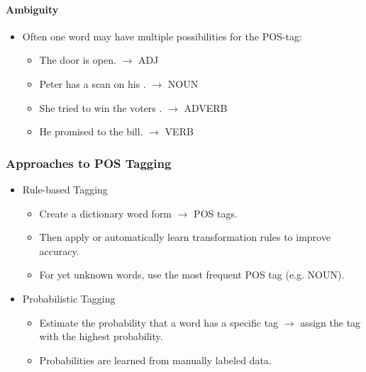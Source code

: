                 \paragraph{Ambiguity} %
                    \begin{itemize}
                    	\item Often one word may have multiple possibilities for the POS-tag:
                    		\begin{itemize}
                    			\item The  door is open. \( \rightarrow \) ADJ
                    			\item Peter has a scan on his . \( \rightarrow \) NOUN
                    			\item She tried to win the voters . \( \rightarrow \) ADVERB
                    			\item He promised to  the bill. \( \rightarrow \) VERB
                    		\end{itemize}
                    \end{itemize}

            \subsubsection{Approaches to  POS Tagging} %
                \begin{itemize}
                	\item Rule-based Tagging
                		\begin{itemize}
                			\item Create a dictionary word form \(\rightarrow\) POS tags.
                			\item Then apply or automatically learn transformation rules to improve accuracy.
                			\item For yet unknown words, use the most frequent POS tag (e.g. NOUN).
                		\end{itemize}
                	\item Probabilistic Tagging
                		\begin{itemize}
                			\item Estimate the probability that a word has a specific tag \( \rightarrow \) assign the tag with the highest probability.
                			\item Probabilities are learned from manually labeled data.
                		\end{itemize}
                \end{itemize}

